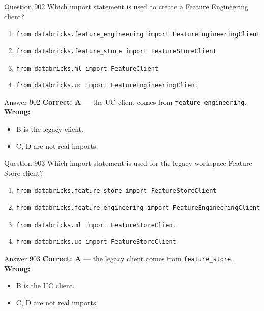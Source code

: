 \documentclass[aspectratio=169,11pt]{beamer}
\begin{document}
	\begin{frame}{Question 902}
		Which import statement is used to create a Feature Engineering client?
		\begin{enumerate}[label=\Alph*.]
			\item \texttt{from databricks.feature\_engineering import FeatureEngineeringClient}
			\item \texttt{from databricks.feature\_store import FeatureStoreClient}
			\item \texttt{from databricks.ml import FeatureClient}
			\item \texttt{from databricks.uc import FeatureEngineeringClient}
		\end{enumerate}
	\end{frame}
	\begin{frame}{Answer 902}
		\textbf{Correct: A} --- the UC client comes from \texttt{feature\_engineering}.\\
		\vspace{0.5em}
		\textbf{Wrong:}
		\begin{itemize}
			\item B is the legacy client.
			\item C, D are not real imports.
		\end{itemize}
	\end{frame}
	
	\begin{frame}{Question 903}
		Which import statement is used for the legacy workspace Feature Store client?
		\begin{enumerate}[label=\Alph*.]
			\item \texttt{from databricks.feature\_store import FeatureStoreClient}
			\item \texttt{from databricks.feature\_engineering import FeatureEngineeringClient}
			\item \texttt{from databricks.ml import FeatureStoreClient}
			\item \texttt{from databricks.uc import FeatureStoreClient}
		\end{enumerate}
	\end{frame}
	\begin{frame}{Answer 903}
		\textbf{Correct: A} --- the legacy client comes from \texttt{feature\_store}.\\
		\vspace{0.5em}
		\textbf{Wrong:}
		\begin{itemize}
			\item B is the UC client.
			\item C, D are not real imports.
		\end{itemize}
	\end{frame}
	
\end{document}
